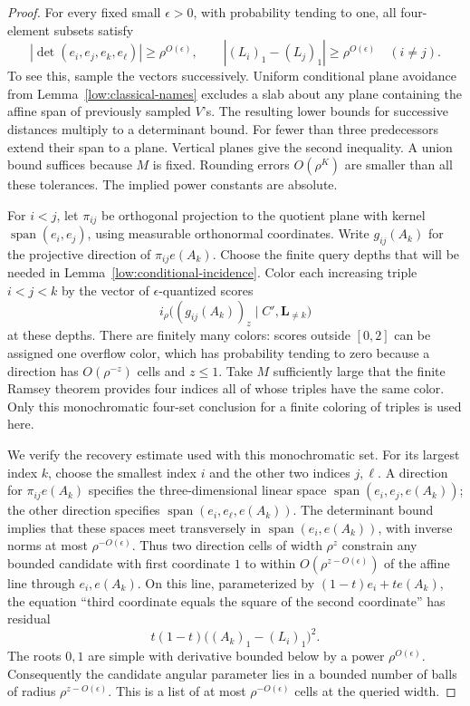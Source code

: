 \begin{proof}
For every fixed small $\epsilon>0$, with probability tending to one,
all four-element subsets satisfy
\[
 |\det(e_i,e_j,e_k,e_\ell)|\geq\rho^{O(\epsilon)},
 \qquad |(L_i)_1-(L_j)_1|\geq\rho^{O(\epsilon)}\quad(i\ne j).
\]
To see this, sample the vectors successively. Uniform conditional plane
avoidance from Lemma~\ref{low:classical-names} excludes a slab about
any plane containing the affine span of previously sampled $V$'s.
The resulting lower bounds for successive distances multiply to a
determinant bound. For fewer than three predecessors extend their span
to a plane. Vertical planes give the second inequality. A union bound
suffices because $M$ is fixed. Rounding errors $O(\rho^K)$ are smaller
than all these tolerances. The implied power constants are absolute.

For $i<j$, let $\pi_{ij}$ be orthogonal projection to the quotient
plane with kernel $\operatorname{span}(e_i,e_j)$, using measurable
orthonormal coordinates. Write $g_{ij}(A_k)$ for the projective
direction of $\pi_{ij}e(A_k)$. Choose the finite query depths that
will be needed in Lemma~\ref{low:conditional-incidence}. Color each
increasing triple $i<j<k$ by the vector of $\epsilon$-quantized scores
\[
 i_\rho\bigl((g_{ij}(A_k))_z\mid C',\mathbf L_{\ne k}\bigr)
\]
at these depths. There are finitely many colors: scores outside
$[0,2]$ can be assigned one overflow color, which has probability
tending to zero because a direction has $O(\rho^{-z})$ cells and
$z\leq1$. Take $M$ sufficiently large that the finite Ramsey theorem
\cite[Theorem~B, p.~267]{Ramsey1930}
provides four indices all of whose triples have the same color.
Only this monochromatic four-set conclusion for a finite coloring of
triples is used here.

We verify the recovery estimate used with this monochromatic set.
For its largest index $k$, choose the smallest index $i$ and the other
two indices $j,\ell$. A direction for $\pi_{ij}e(A_k)$ specifies the
three-dimensional linear space
$\operatorname{span}(e_i,e_j,e(A_k))$; the other direction specifies
$\operatorname{span}(e_i,e_\ell,e(A_k))$.
The determinant bound implies that these spaces meet transversely in
$\operatorname{span}(e_i,e(A_k))$, with inverse norms at most
$\rho^{-O(\epsilon)}$. Thus two direction cells of width $\rho^z$
constrain any bounded candidate with first coordinate $1$ to within
$O(\rho^{z-O(\epsilon)})$ of the affine line through $e_i,e(A_k)$.
On this line, parameterized by $(1-t)e_i+te(A_k)$, the equation
``third coordinate equals the square of the second coordinate''
has residual
\[
 t(1-t)\bigl((A_k)_1-(L_i)_1\bigr)^2.
\]
The roots $0,1$ are simple with derivative bounded below by a power
$\rho^{O(\epsilon)}$. Consequently the candidate angular parameter
lies in a bounded number of balls of radius
$\rho^{z-O(\epsilon)}$. This is a list of at most
$\rho^{-O(\epsilon)}$ cells at the queried width.


\end{proof}
